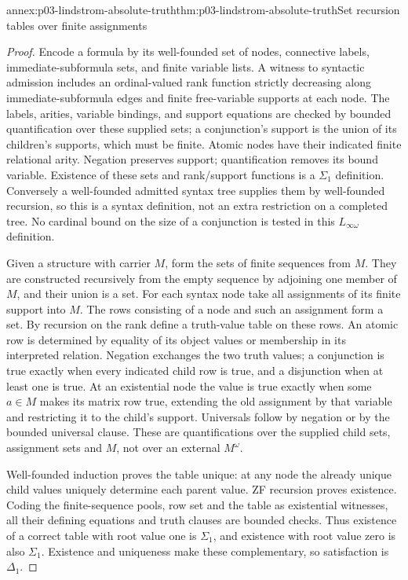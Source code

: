 \begin{annexitem}{annex:p03-lindstrom-absolute-truth}{thm:p03-lindstrom-absolute-truth}{Set recursion tables over finite assignments}
\begin{proof}
Encode a formula by its well-founded set of nodes, connective labels,
immediate-subformula sets, and finite variable lists. A witness to syntactic
admission includes an ordinal-valued rank function strictly decreasing
along immediate-subformula edges and finite free-variable supports at each
node. The labels, arities, variable bindings, and support equations are
checked by bounded quantification over these supplied sets; a conjunction's
support is the union of its children's supports, which must be finite.
Atomic nodes have their indicated finite relational arity. Negation preserves
support; quantification removes its bound variable. Existence of these
sets and rank/support functions is a \(\Sigma_1\) definition. Conversely
a well-founded admitted syntax tree supplies them by well-founded recursion,
so this is a syntax definition, not an extra restriction on a completed tree.
No cardinal bound on the size of a conjunction is tested in this
\(L_{\infty\omega}\) definition.

Given a structure with carrier \(M\), form the sets of finite sequences
from \(M\). They are constructed recursively from the empty sequence
by adjoining one member of \(M\), and their union is a set. For each
syntax node take all assignments of its finite support into \(M\).
The rows consisting of a node and such an assignment form a set.
By recursion on the rank define a truth-value table on these rows.
An atomic row is determined by equality of its object values or membership
in its interpreted relation. Negation exchanges the two truth values;
a conjunction is true exactly when every indicated child row is true,
and a disjunction when at least one is true. At an existential node the
value is true exactly when some \(a\in M\) makes its matrix row true,
extending the old assignment by that variable and restricting it to the
child's support. Universals follow by negation or by the bounded universal
clause. These are quantifications over the supplied child sets, assignment
sets and \(M\), not over an external \(M^\omega\).

Well-founded induction proves the table unique: at any node the already
unique child values uniquely determine each parent value. ZF recursion
proves existence. Coding the finite-sequence pools, row set and the table
as existential witnesses, all their defining equations and truth clauses
are bounded checks. Thus existence of a correct table with root value
one is \(\Sigma_1\), and existence with root value zero is also
\(\Sigma_1\). Existence and uniqueness make these complementary,
so satisfaction is \(\Delta_1\).


\end{proof}
\end{annexitem}
